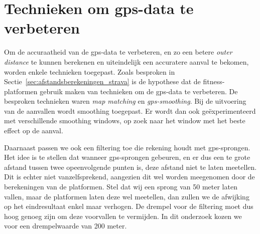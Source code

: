 \section{Technieken om gps-data te verbeteren}
Om de accuraatheid van de \ac{gps}-data te verbeteren, en zo een betere
\textit{outer distance} te kunnen berekenen en uiteindelijk een accuratere
aanval te bekomen, worden enkele technieken toegepast. Zoals besproken in
Sectie~\ref{sec:afstandsberekeningen_strava} is de hypothese dat de
fitness-platformen gebruik maken van technieken om de \ac{gps}-data te
verbeteren. De besproken technieken waren \textit{map matching} en
\textit{\ac{gps}-smoothing}. Bij de uitvoering van de aanvallen wordt smoothing
toegepast. Er wordt dan ook geëxperimenteerd met verschillende smoothing
windows, op zoek naar het window met het beste effect op de aanval.

Daarnaast passen we ook een filtering toe die rekening houdt met
\ac{gps}-sprongen. Het idee is te stellen dat wanneer \ac{gps}-sprongen
gebeuren, en er dus een te grote afstand tussen twee opeenvolgende punten is,
deze afstand niet te laten meetellen. Dit is echter niet vanzelfsprekend,
aangezien dit wel worden meegenomen door de berekeningen van de platformen.
Stel dat wij een sprong van 50 meter laten vallen, maar de platformen laten
deze wel meetellen, dan zullen we de afwijking op het eindresultaat enkel maar
verhogen. De drempel voor de filtering moet dus hoog genoeg zijn om deze
voorvallen te vermijden. In dit onderzoek kozen we voor een drempelwaarde van
200 meter.